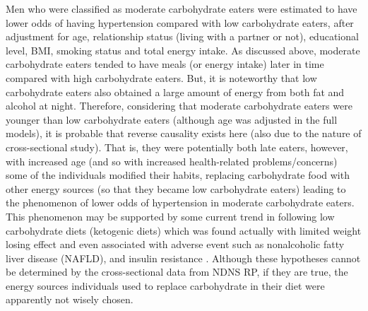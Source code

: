 Men who were classified as moderate carbohydrate eaters were estimated to have lower odds of having hypertension compared with low carbohydrate eaters, after adjustment for age, relationship status (living with a partner or not), educational level, BMI, smoking status and total energy intake. As discussed above, moderate carbohydrate eaters tended to have meals (or energy intake) later in time compared with high carbohydrate eaters. But, it is noteworthy that low carbohydrate eaters also obtained a large amount of energy from both fat and alcohol at night. Therefore, considering that moderate carbohydrate eaters were younger than low carbohydrate eaters (although age was adjusted in the full models), it is probable that reverse causality exists here (also due to the nature of cross-sectional study). That is, they were potentially both late eaters, however, with increased age (and so with increased health-related problems/concerns) some of the individuals modified their habits,  replacing carbohydrate food with other energy sources (so that they became low carbohydrate eaters) leading to the phenomenon of lower odds of hypertension in moderate carbohydrate eaters. This phenomenon may be supported by some current trend in following low carbohydrate diets (ketogenic diets) which was found actually with limited weight losing effect and even associated with adverse event such as nonalcoholic fatty liver disease (NAFLD), and insulin resistance \parencite{kosinski2017effects}. Although these hypotheses cannot be determined by the cross-sectional data from NDNS RP, if they are true, the energy sources individuals used to replace carbohydrate in their diet were apparently not wisely chosen. 

